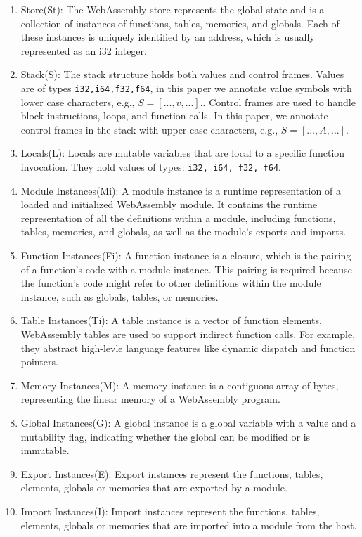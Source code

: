 \begin{enumerate}
    \item Store(St): The WebAssembly store represents the global state and is a collection of instances of functions, tables, memories, and globals. Each of these instances is uniquely identified by an address, which is usually represented as an i32 integer.

    \item Stack(S): The stack structure holds both values and control frames. 
    Values are of types \texttt{i32,i64,f32,f64}, in this paper we annotate value symbols with lower case characters, e.g., $S=[...,v,...]$..
    Control frames are used to handle block instructions, loops, and function calls.
    In this paper, we annotate control frames in the stack with upper case characters, e.g., $S=[...,A,...]$.

    \item Locals(L): Locals are mutable variables that are local to a specific function invocation. They hold values of types: \texttt{i32, i64, f32, f64}.

    \item Module Instances(Mi): A module instance is a runtime representation of a loaded and initialized WebAssembly module. It contains the runtime representation of all the definitions within a module, including functions, tables, memories, and globals, as well as the module's exports and imports.

    \item Function Instances(Fi): A function instance is a closure, which is the pairing of a function's code with a module instance. This pairing is required because the function's code might refer to other definitions within the module instance, such as globals, tables, or memories.

    \item Table Instances(Ti): A table instance is a vector of function elements. WebAssembly tables are used to support indirect function calls. For example, they abstract high-levle language features like dynamic dispatch and function pointers.

    \item  Memory Instances(M): A memory instance is a contiguous array of bytes, representing the linear memory of a WebAssembly program. 

    \item  Global Instances(G): A global instance is a global variable with a value and a mutability flag, indicating whether the global can be modified or is immutable.

    \item Export Instances(E): Export instances represent the functions, tables, elements, globals or memories that are exported by a module. 

    \item Import Instances(I): Import instances represent the functions, tables, elements, globals or memories that are imported into a module from the host. 
\end{enumerate}

